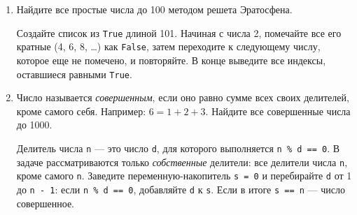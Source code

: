 \documentclass[a4,12pt]{article}
\theoremstyle{remark}
\begin{document}
\begin{enumerate}
    \item Найдите все простые числа до 100 методом решета Эратосфена.

    \begin{exercisehint}
        Создайте список из \texttt{True} длиной 101. Начиная с числа 2,
        помечайте все его кратные (4, 6, 8, \ldots) как \texttt{False},
        затем переходите к следующему числу, которое еще не помечено, и повторяйте.
        В конце выведите все индексы, оставшиеся равными \texttt{True}.
    \end{exercisehint}



    \item Число называется \emph{совершенным}, если оно равно сумме
всех своих делителей, кроме самого себя.
Например: $6 = 1 + 2 + 3$.
Найдите все совершенные числа до 1000.

\begin{exercisehint}
    Делитель числа \texttt{n} --- это число \texttt{d}, для которого
    выполняется \texttt{n \% d == 0}.
    В задаче рассматриваются только \emph{собственные} делители:
    все делители числа \texttt{n}, кроме самого \texttt{n}.
    Заведите переменную-накопитель \texttt{s = 0} и перебирайте
    \texttt{d} от 1 до \texttt{n - 1}: если \texttt{n \% d == 0},
    добавляйте \texttt{d} к \texttt{s}.
    Если в итоге \texttt{s == n} --- число совершенное.
\end{exercisehint}


\end{enumerate}
\end{document}
